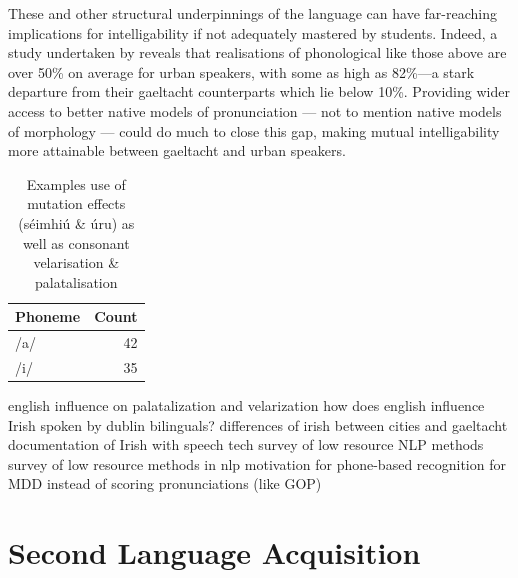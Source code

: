 \documentclass[thesis]{cluu}
\begin{document}
These and other structural underpinnings of the language can have far-reaching implications for intelligability if not adequately mastered by students. Indeed, a study undertaken by\textcite{broinNewUrbanIrish} reveals that realisations of phonological like those above are over 50\% on average for urban speakers, with some as high as 82\%---a stark departure from their gaeltacht counterparts which lie below 10\%. Providing wider access to better native models of pronunciation --- not to mention native models of morphology --- could do much to close this gap, making mutual intelligability more attainable between gaeltacht and urban speakers. 

\begin{table}[ht]
  \centering
  \caption{Examples use of mutation effects (séimhiú \& úru) as well as consonant velarisation \& palatalisation}
  \begin{tabular}{l r}
    Phoneme & Count \\
    \hline
    /a/ & 42 \\
    /i/ & 35 \\
  \end{tabular}
  \label{tab:sound_contrasts}
\end{table}

\textcite{gabrieleEnglishInfluenceL2} english influence on palatalization and velarization
\textcite{snesarevaPalatalizationDublinIrish2016} how does english influence Irish spoken by dublin bilinguals?
\textcite{broinNewUrbanIrish} differences of irish between cities and gaeltacht
\textcite{nichasaideSPEECHTECHNOLOGYDOCUMENTATION} documentation of Irish with speech tech
\textcite{hedderichSurveyRecentApproaches2021} survey of low resource NLP methods
\textcite{magueresseLowresourceLanguagesReview2020} survey of low resource methods in \gls{nlp}
\textcite{wuTransformerBasedEndtoEnd2021} motivation for phone-based recognition for MDD instead of scoring pronunciations (like GOP)

\section{Second Language Acquisition}
\end{document}
